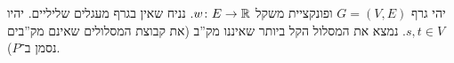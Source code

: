 \documentclass[]{../../../../tex/classes/homework}
\begin{document}
	 \section{}
	יהי גרף $G =(V, E)$ ופונקציית משקל $w \colon E \to \mathbb{R}$. נניח שאין בגרף מעגלים שליליים. יהיו $s, t \in V$. נמצא את המסלול הקל ביותר שאיננו מק''ב (את קבוצת המסלולים שאינם מק''בים נסמן ב־$P$). 
\end{document}
